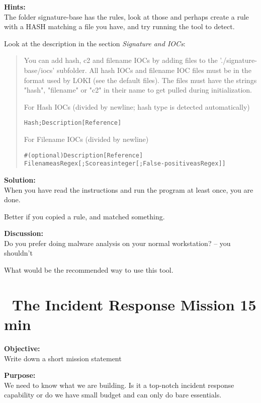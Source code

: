 \documentclass[a4paper,11pt,notitlepage]{report}
\begin{document}
{\bf Hints:}\\
The folder signature-base has the rules, look at those and perhaps create a rule with a HASH matching a file you have, and try running the tool to detect.

Look at the description in the section \emph{Signature and IOCs}:

\begin{quote}
You can add hash, c2 and filename IOCs by adding files to the './signature-base/iocs' subfolder. All hash IOCs and filename IOC files must be in the format used by LOKI (see the default files). The files must have the strings "hash", "filename" or "c2" in their name to get pulled during initialization.

For Hash IOCs (divided by newline; hash type is detected automatically)

\begin{alltt}
Hash;Description [Reference]
\end{alltt}

For Filename IOCs (divided by newline)
\begin{alltt}
# (optional) Description [Reference]
Filename as Regex[;Score as integer[;False-positive as Regex]]
\end{alltt}
\end{quote}

{\bf Solution:}\\
When you have read the instructions and run the program at least once, you are done.

Better if you copied a rule, and matched something.

{\bf Discussion:}\\
Do you prefer doing malware analysis on your normal workstation? -- you shouldn't

What would be the recommended way to use this tool.


\chapter{\faExclamationTriangle\ The Incident Response Mission 15 min}
\label{ex:the-ir-mission}


{\bf Objective:}\\
Write down a short mission statement

{\bf Purpose:}\\
We need to know what we are building. Is it a top-notch incident response capability or do we have small budget and can only do bare essentials.
\end{document}
